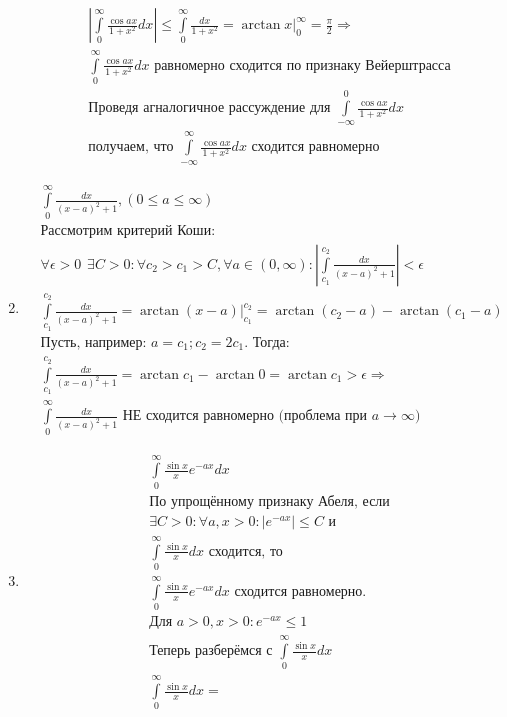 \documentclass[a4paper, 12pt]{article}
\begin{document}
\begin{enumerate}
\begin{align*}
 &\left|\int\limits_0^\infty \frac{\cos ax}{1+x^2}dx\right| \leq 
 \int\limits_0^\infty \frac{dx}{1+x^2} = 
 \arctan x \Big|_0^\infty = \frac{\pi}{2} \Rightarrow \\
 &\int\limits_0^\infty \frac{\cos ax}{1+x^2}dx \text{ равномерно сходится по признаку Вейерштрасса} \\
 &\text{Проведя агналогичное рассуждение для }
 \int\limits_{-\infty}^0 \frac{\cos ax}{1+x^2}dx \\
 &\text{получаем, что }
 \int\limits_{-\infty}^\infty \frac{\cos ax}{1+x^2}dx
 \text{ сходится равномерно}
\end{align*}
\item
\begin{align*}
  &\int\limits_0^\infty \frac{dx}{(x-a)^2+1}, (0\leq a \leq \infty) \\
  &\text{Рассмотрим критерий Коши:} \\
  &\forall \epsilon > 0 \hspace{5pt} \exists C>0 : \forall c_2>c_1>C, \forall a\in(0,\infty):
  \left|\int\limits_{c_1}^{c_2} \frac{dx}{(x-a)^2+1} \right| < \epsilon \\
  &\int\limits_{c_1}^{c_2} \frac{dx}{(x-a)^2+1} = 
  \arctan (x-a) \Big|_{c_1}^{c_2} = 
  \arctan(c_2-a) - \arctan(c_1-a) \\
  &\text{Пусть, например: } a=c_1; c_2=2 c_1. \text{ Тогда:} \\
  &\int\limits_{c_1}^{c_2} \frac{dx}{(x-a)^2+1} = 
  \arctan c_1 - \arctan 0 = \arctan c_1 > \epsilon \Rightarrow \\
  &\int\limits_0^\infty \frac{dx}{(x-a)^2+1}\text{ НЕ сходится равномерно (проблема при $a\to\infty$)}
\end{align*}
\item
\begin{align*}
 &\int\limits_0^\infty \frac{\sin x}{x}e^{-ax}dx \\
 &\text{По упрощённому признаку Абеля, если} \\
 &\exists C >0: \forall a, x>0: \left|e^{-ax}\right|\leq C \text{ и } \\
 &\int\limits_0^\infty \frac{\sin x}{x}dx \text{ сходится, то } \\
 &\int\limits_0^\infty \frac{\sin x}{x}e^{-ax}dx \text{ сходится равномерно.} \\
 &\text{Для } a>0,x>0: e^{-ax} \leq 1 \\
 &\text{Теперь разберёмся с }\int\limits_0^\infty \frac{\sin x}{x}dx \\
 &\int\limits_0^\infty \frac{\sin x}{x}dx = 

\end{align*}
\end{enumerate}
\end{document}
